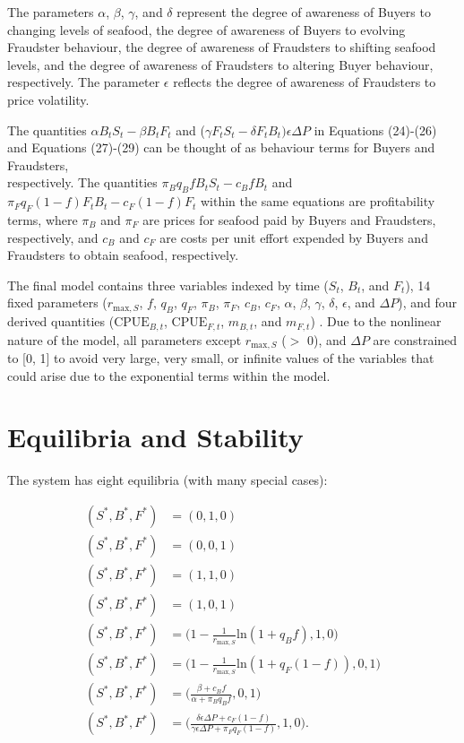 \documentclass[12pt]{article}
\begin{document}
The parameters $\alpha$, $\beta$, $\gamma$, and $\delta$ represent the degree of awareness of Buyers to changing levels of seafood, the degree of awareness of Buyers to evolving Fraudster behaviour, the degree of awareness of Fraudsters to shifting seafood levels, and the degree of awareness of Fraudsters to altering Buyer behaviour, respectively. The parameter $\epsilon$ reflects the degree of awareness of Fraudsters to price volatility.

The quantities $\alpha B_t S_t - \beta B_t F_t$ and ($\gamma F_t S_t - \delta F_t B_t\big)\epsilon\Delta P$ in Equations (24)-(26) and Equations (27)-(29) can be thought of as behaviour terms for Buyers and Fraudsters, \\ respectively. The quantities $\pi_B q_{B}f B_tS_t - c_BfB_t$ and $\pi_F q_{F}(1 - f) F_tB_t - c_F (1 - f) F_t$ within the same equations are profitability terms, where $\pi_B$ and $\pi_F$ are prices for seafood paid by Buyers and Fraudsters, respectively, and $c_B$ and $c_F$ are costs per unit effort expended by Buyers and Fraudsters to obtain seafood, respectively.

The final model contains three variables indexed by time ($S_t$, $B_t$, and $F_t$), 14 fixed parameters ($r_{\mathrm{max}, S}$, $f$, $q_B$, $q_F$, $\pi_B$, $\pi_F$, $c_B$, $c_F$, $\alpha$, $\beta$, $\gamma$, $\delta$, $\epsilon$, and $\Delta P$), and four derived quantities ($\mathrm{CPUE}_{B, t}$, $\mathrm{CPUE}_{F, t}$, $m_{B, t}$, and $m_{F, t}$) . Due to the nonlinear nature of the model, all parameters except $r_{\mathrm{max}, S}$ ($>$ 0), and $\Delta P$ are constrained to [0, 1] to avoid very large, very small, or infinite values of the variables that could arise due to the exponential terms within the model. 


\newpage

\section*{Equilibria and Stability}

The system has eight equilibria (with many special cases):

\begin{align}
(S^*, B^*, F^*) &= (0, 1, 0) \\
(S^*, B^*, F^*) &= (0, 0, 1) \\
(S^*, B^*, F^*) &= (1, 1, 0) \\
(S^*, B^*, F^*) &= (1, 0, 1) \\
(S^*, B^*, F^*) &= \Big(1 - \frac{1}{r_{\mathrm{max}, S}}\mathrm{ln}(1 + q_Bf), 1, 0\Big) \\
(S^*, B^*, F^*) &= \Big(1 - \frac{1}{r_{\mathrm{max}, S}}\mathrm{ln}(1 + q_F(1 - f)), 0, 1\Big)
\\
(S^*, B^*, F^*) &= \Big(\frac{\beta + c_Bf}{\alpha + \pi_B q_Bf}, 0, 1\Big)
\\
(S^*, B^*, F^*) &= \Big(\frac{\delta \epsilon \Delta P + c_F(1 - f)}{\gamma \epsilon \Delta P + \pi_F q_F(1 -f)}, 1, 0\Big).
\end{align}
\end{document}

